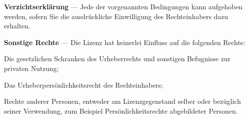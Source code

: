 \noindent
\textbf{Verzichtserklärung} — Jede der vorgenannten Bedingungen kann aufgehoben werden, sofern Sie die ausdrückliche Einwilligung des Rechteinhabers dazu erhalten. 

\noindent
\textbf{Sonstige Rechte} — Die Lizenz hat keinerlei Einfluss auf die folgenden Rechte:
\begin{description}
  \item Die gesetzlichen Schranken des Urheberrechts und sonstigen Befugnisse zur privaten Nutzung;
  \item Das Urheberpersönlichkeitsrecht des Rechteinhabers;
  \item Rechte anderer Personen, entweder am Lizenzgegenstand selber oder bezüglich seiner Verwendung, zum Beispiel Persönlichkeitsrechte abgebildeter Personen.
\end{description}




\mainmatter

